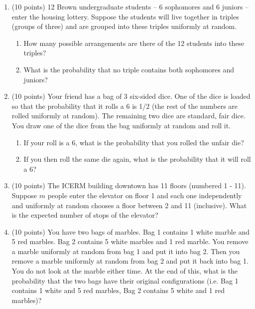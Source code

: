 \documentclass[12pt]{article}
\begin{document}
\begin{enumerate}
\item (10 points) 12 Brown undergraduate students -- 6 sophomores and 6 juniors -- enter the housing lottery. Suppose the students will live together in triples (groups of three) and are grouped into these triples uniformly at random.
\begin{enumerate}
\item How many possible arrangements are there of the 12 students into these triples?
\item What is the probability that no triple contains both sophomores and juniors? 
\end{enumerate}

\pagebreak

\item (10 points) Your friend has a bag of 3 six-sided dice. One of the dice is loaded so that the probability that it rolls a 6 is 1/2 (the rest of the numbers are rolled uniformly at random). The remaining two dice are standard, fair dice. You draw one of the dice from the bag uniformly at random and roll it.
\begin{enumerate}
\item If your roll is a 6, what is the probability that you rolled the unfair die?
\item If you then roll the same die again, what is the probability that it will roll a 6?
\end{enumerate} 

\pagebreak

\item (10 points) The ICERM building downtown has 11 floors (numbered 1 - 11). Suppose $m$ people enter the elevator on floor 1 and each one independently and uniformly at random chooses a floor between 2 and 11 (inclusive). What is the expected number of stops of the elevator?

\pagebreak

\item (10 points) You have two bags of marbles. Bag 1 contains 1 white marble and 5 red marbles. Bag 2 contains 5 white marbles and 1 red marble. You remove a marble uniformly at random from bag 1 and put it into bag 2. Then you remove a marble uniformly at random from bag 2 and put it back into bag 1. You do not look at the marble either time. At the end of this, what is the probability that the two bags have their original configurations (i.e. Bag 1 contains 1 white and 5 red marbles, Bag 2 contains 5 white and 1 red marbles)?


\end{enumerate}
\end{document}
